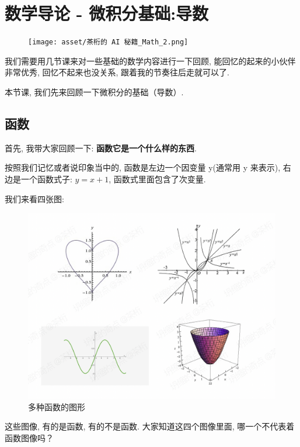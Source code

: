 \chapter{数学导论 - 微积分基础:导数}

\begin{figure}[ht]
  \centering\texttt{[image: asset/茶桁的 AI 秘籍\_Math\_2.png]}
\end{figure}

\newpage

我们需要用几节课来对一些基础的数学内容进行一下回顾, 能回忆的起来的小伙伴非常优秀, 回忆不起来也没关系, 跟着我的节奏往后走就可以了. 

本节课, 我们先来回顾一下微积分的基础（导数）. 

\section{函数}

首先, 我带大家回顾一下: \textbf{函数它是一个什么样的东西}. 

按照我们记忆或者说印象当中的, 函数是左边一个因变量 y(通常用 y 来表示), 右边是一个函数式子: $y=x+1$, 函数式里面包含了次变量. 

我们来看四张图:

\begin{figure}[ht]
  \centering
  \includegraphics[width=1\textwidth]{asset/fa27e701-ba74-4406-bcb2-7956f4188918.png}
  \caption{多种函数的图形}
  \label{fig:img3_1}
\end{figure}

这些图像, 有的是函数, 有的不是函数. 大家知道这四个图像里面, 哪一个不代表着函数图像吗？

